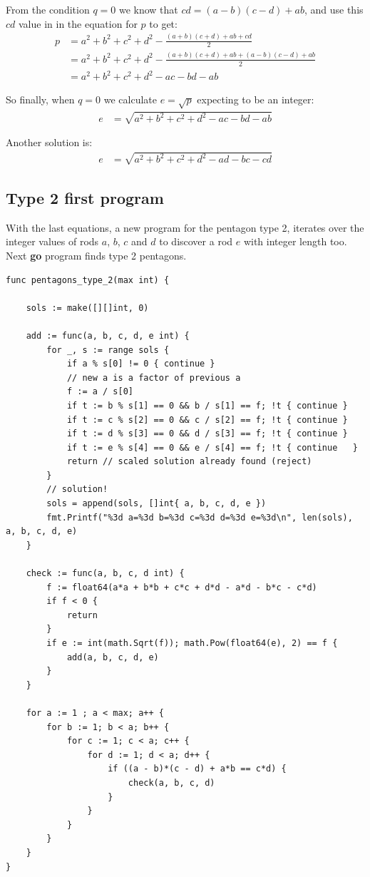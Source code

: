 \documentclass[11pt]{article}
\begin{document}
From the condition $q=0$ we know that $cd = (a-b)(c-d)+ab$, and use this $cd$ value in 
in the equation for $p$ to get:
\begin{align*}
p &= a^2+b^2+c^2+d^2 - \frac{(a+b)(c+d)+ab+cd}{2}\\
  &= a^2+b^2+c^2+d^2 - \frac{(a+b)(c+d)+ab+(a-b)(c-d)+ab}{2}\\
  &= a^2+b^2+c^2+d^2 -ac -bd -ab
\end{align*}

So finally, when $q=0$ we calculate $e = \sqrt{p}$ expecting to be an integer:
\begin{align*}
e &= \sqrt{a^2 + b^2 + c^2 + d^2 -ac -bd - ab}
\end{align*}

Another solution is:
\begin{align*}
e &= \sqrt{a^2 + b^2 + c^2 + d^2 -ad -bc - cd}
\end{align*}


\subsection{Type 2 first program}

With the last equations, a new program for the pentagon type 2, iterates over the integer values of rods $a$, $b$, $c$ and $d$ to discover a rod $e$ with integer length too. Next \textbf{go} 
program finds type 2 pentagons.
\begin{lstlisting}
func pentagons_type_2(max int) {

	sols := make([][]int, 0)

	add := func(a, b, c, d, e int) {
		for _, s := range sols {
			if a % s[0] != 0 { continue }
			// new a is a factor of previous a
			f := a / s[0]
			if t := b % s[1] == 0 && b / s[1] == f; !t { continue }
			if t := c % s[2] == 0 && c / s[2] == f; !t { continue }
			if t := d % s[3] == 0 && d / s[3] == f; !t { continue }
			if t := e % s[4] == 0 && e / s[4] == f; !t { continue	}
			return // scaled solution already found (reject)
		}
		// solution!
		sols = append(sols, []int{ a, b, c, d, e })
		fmt.Printf("%3d a=%3d b=%3d c=%3d d=%3d e=%3d\n", len(sols), a, b, c, d, e)
	}

	check := func(a, b, c, d int) {
		f := float64(a*a + b*b + c*c + d*d - a*d - b*c - c*d)
	    if f < 0 {
	    	return
	    }
		if e := int(math.Sqrt(f)); math.Pow(float64(e), 2) == f {
			add(a, b, c, d, e)
		}
	}

    for a := 1 ; a < max; a++ {
    	for b := 1; b < a; b++ {
        	for c := 1; c < a; c++ {
          		for d := 1; d < a; d++ {
            		if ((a - b)*(c - d) + a*b == c*d) {
              			check(a, b, c, d)
              		}
              	}
            }
        }
    }
}
\end{lstlisting}
\end{document}
